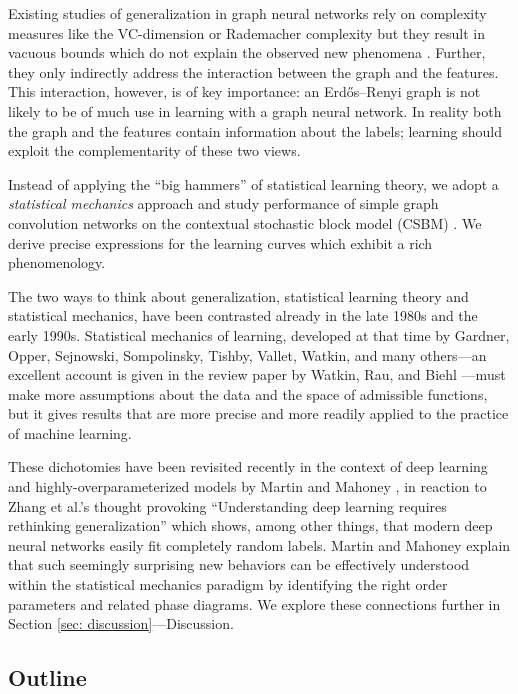 \documentclass[9pt,twocolumn]{pnas-new}
\newcommand{\idd}[1]{{#1}}
\begin{document}
Existing studies of generalization in graph neural networks rely on complexity measures like the VC-dimension or Rademacher complexity but they result in vacuous bounds which do not explain the observed new phenomena \cite{garg2020generalization,liao2021a,esser2021learning}. Further, they only indirectly address the interaction between the graph and the features. \idd{This interaction, however, is of key importance: an Erdős--Renyi graph is not likely to be of much use in learning with a graph neural network. In reality both the graph and the features contain information about the labels; learning should exploit the complementarity of these two views.}


\idd{Instead of applying the ``big hammers'' of statistical learning theory, we adopt a \emph{statistical mechanics} approach and study performance of simple graph convolution networks on the contextual stochastic block model (CSBM) \cite{deshpande2018contextual}. We derive precise expressions for the learning curves which exhibit a rich phenomenology.

The two ways to think about generalization, statistical learning theory and statistical mechanics, have been contrasted already in the late 1980s and the early 1990s. Statistical mechanics of learning, developed at that time by Gardner, Opper, Sejnowski, Sompolinsky, Tishby, Vallet, Watkin, and many others---an excellent account is given in the review paper by Watkin, Rau, and Biehl \cite{watkin1993statistical}---must make more assumptions about the data and the space of admissible functions, but it gives results that are more precise and more readily applied to the practice of machine learning.

These dichotomies have been revisited recently in the context of deep learning and highly-overparameterized models by Martin and Mahoney \cite{martin2017rethinking}, in reaction to Zhang et al.'s thought provoking  ``Understanding deep learning requires rethinking generalization'' \cite{DBLP:conf/iclr/ZhangBHRV17} which shows, among other things, that modern deep neural networks easily fit completely random labels. Martin and Mahoney explain that such seemingly surprising new behaviors can be effectively understood within the statistical mechanics paradigm by identifying the right order parameters and related phase diagrams. We explore these connections further in Section \ref{sec: discussion}---Discussion.}


\subsection*{Outline}
\end{document}
